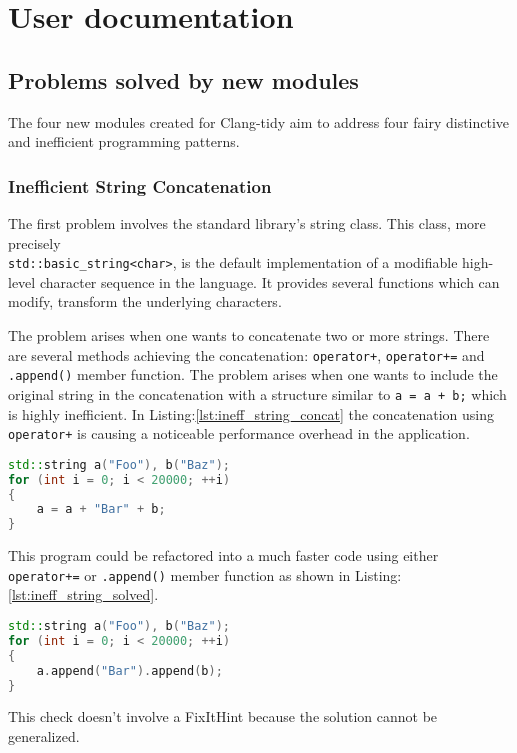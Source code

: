 \section{User documentation}
\subsection{Problems solved by new modules}
\par The four new modules created for Clang-tidy aim to address four fairy distinctive and inefficient programming patterns. 
\subsubsection{Inefficient String Concatenation\cite{clang_tidy_string_concat}}
\par The first problem involves the standard library's string class. This class, more precisely \\\verb|std::basic_string<char>|, is the default implementation of a modifiable high-level character sequence in the language. It provides several functions which can modify, transform the underlying characters. \medskip
\par The problem arises when one wants to concatenate two or more strings. There are several methods achieving the concatenation: \verb|operator+|, \verb|operator+=| and \verb|.append()| member function. The problem arises when one wants to include the original string in the concatenation with a structure similar to \verb|a = a + b;| which is highly inefficient. In Listing:\ref{lst:ineff_string_concat} the concatenation using \verb|operator+| is causing a noticeable performance overhead in the application.  \\
\begin{lstlisting}[language=c++, frame=single ,caption={Highly inefficient code}, label={lst:ineff_string_concat}]
std::string a("Foo"), b("Baz");
for (int i = 0; i < 20000; ++i) 
{
	a = a + "Bar" + b;
}
\end{lstlisting}
\par This program could be refactored into a much faster code using either \verb|operator+=| or \verb|.append()| member function as shown in Listing:\ref{lst:ineff_string_solved}.
 \begin{lstlisting}[language=c++, frame=single ,caption={A more efficient version}, label={lst:ineff_string_solved}]
std::string a("Foo"), b("Baz");
for (int i = 0; i < 20000; ++i) 
{
	a.append("Bar").append(b);
}
 \end{lstlisting}
 \par This check doesn't involve a FixItHint because the solution cannot be generalized. 
